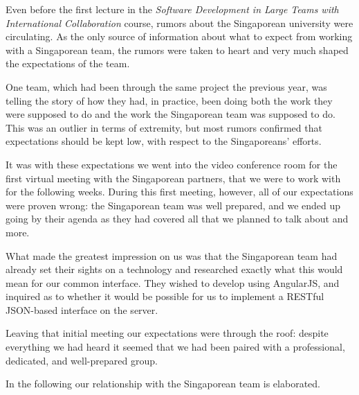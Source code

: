 Even before the first lecture in the \emph{Software
Development in Large Teams with International Collaboration} course, rumors
about the Singaporean university were circulating. As the only source of
information about what to expect from working with a Singaporean team, the
rumors were taken to heart and very much shaped the expectations of the team.

One team, which had been through the same project the previous year, was telling
the story of how they had, in
practice, been doing both the work they were supposed to do and the work the
Singaporean team was supposed to do. This was an outlier in terms of extremity,
but most rumors confirmed that expectations should be kept low, with respect to
the Singaporeans' efforts.

It was with these expectations we went into the video conference room for the
first virtual meeting with the Singaporean partners, that we were to work with
for the following weeks. During this first meeting, however, all of our
expectations were proven wrong: the Singaporean team was well prepared, and we
ended up going by their agenda as they had covered all that we planned to talk
about and more.

What made the greatest impression on us was that the Singaporean team had
already set their sights on a technology and researched exactly what this would
mean for our common interface. They wished to develop using AngularJS, and
inquired as to whether it would be possible for us to implement a RESTful
JSON-based interface on the server.

Leaving that initial meeting our expectations were through the roof: despite
everything we had heard it seemed that we had been paired with a professional,
dedicated, and well-prepared group.

In the following our relationship with the Singaporean team is elaborated.
